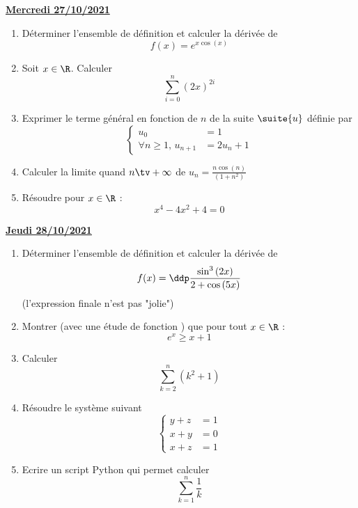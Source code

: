 \documentclass[a4paper, 11pt,reqno]{article}
\newcommand{\jour}[1]{
\begin{center}
\underline{\textbf{#1}}
\end{center}

 }
\begin{document}
\jour{Mercredi 27/10/2021}
\begin{exercice}
\begin{enumerate}
\item  Déterminer l'ensemble de définition et calculer la dérivée de
$$f(x)=e^{x\cos{(x)}}$$
\item Soit $x\in\R$. Calculer $$\sum_{i=0}^n (2x)^{2i}$$ 
\item Exprimer le terme général en fonction de $n$ de la suite $\suite{u}$ définie par 
$$\left\{\begin{array}{rl}
u_0 &=1\\
\forall n\geq 1,\,  u_{n+1}&= 2u_n +1
\end{array}\right.$$
\item Calculer la limite quand $n\tv+\infty$ de $u_n=\frac{n\cos(n)}{(1+n^2)}$
\item Résoudre pour $x\in \R$ :
$$x^4-4x^2+4=0$$
\end{enumerate}
\end{exercice}

\jour{Jeudi 28/10/2021}
\begin{exercice}
\begin{enumerate}
\item  Déterminer l'ensemble de définition et calculer la dérivée de
 $$f(x)=\ddp\frac{\sin^3{(2x)}}{2+\cos{(5x)}}$$
 (l'expression finale n'est pas "jolie")
\item  Montrer (avec une étude de fonction ) que pour tout $x\in \R$ :
$$e^x\geq x+1$$
\item  Calculer 
$$\sum_{k=2}^{n} (k^2+1)$$
\item Résoudre le système suivant 
$$\left\{ 
\begin{array}{cc}
y+z&=1\\
x+y&=0\\
x+z&=1
\end{array}
\right.$$
\item Ecrire un script Python qui permet calculer 
$$\sum_{k=1}^n \frac{1}{k}$$
\end{enumerate}
\end{exercice}
\end{document}
